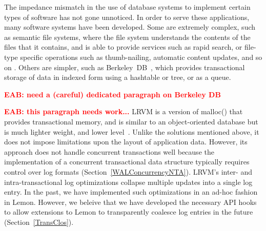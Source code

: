 \documentclass[letterpaper,twocolumn,english]{article}
\newcommand{\yad}{Lemon\xspace}
\newcommand{\eab}[1]{\textcolor{red}{\bf EAB: #1}}
\begin{document}
The impedance mismatch in the use of database systems to implement
certain types of software has not gone unnoticed.
%
%
%
In
order to serve these applications, many software systems have been 
developed.  Some are extremely complex, such as semantic file
systems, where the file system understands the contents of the files
that it contains, and is able to provide services such as rapid
search, or file-type specific operations such as thumb-nailing,
automatic content updates, and so on \cite{Reiser4,WinFS,BeOS,SemanticFSWork,SemanticWeb}.  Others are simpler, such as
Berkeley~DB~\cite{bdb, berkeleyDB}, which provides transactional
storage of data in indexed form using a hashtable or tree, or as a queue.  

\eab{need a (careful) dedicated paragraph on Berkeley DB}

\eab{this paragraph needs work...}
LRVM is a version of malloc() that provides
transactional memory, and is similar to an object-oriented database
but is much lighter weight, and lower level~\cite{lrvm}.  Unlike 
the solutions mentioned above, it does not impose limitations upon 
the layout of application data.
However, its approach does not handle concurrent
transactions well because the implementation of a concurrent transactional
data structure typically requires control over log formats (Section~\ref{WALConcurrencyNTA}).  
LRVM's inter- 
and intra-transactional log optimizations collapse multiple updates 
into a single log entry.  In the past, we have implemented such 
optimizations in an ad-hoc fashion in \yad.  However, we beleive 
that we have developed the necessary API hooks 
to allow extensions to \yad to transparently coalesce log entries in the future (Section~\ref{TransClos}).
\end{document}
